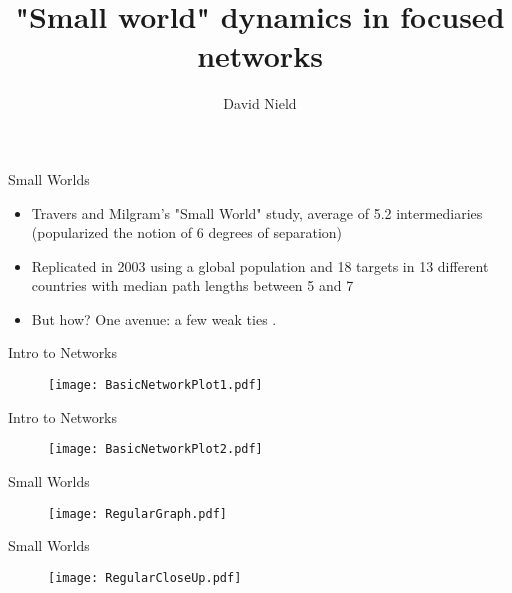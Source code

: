 \documentclass[10pt]{beamer}
\title{"Small world" dynamics in focused networks}
\date{}
\author{David Nield}
\institute{University of California, Berkeley}
\newcommand{\halfblankline}{\quad\vspace{-0.5\baselineskip}\pagebreak[3]}
\begin{document}
\maketitle

\begin{frame}[fragile]{Small Worlds}

\begin{itemize}
\item Travers and Milgram's "Small World" study, average of 5.2 intermediaries (popularized the notion of 6 degrees of separation) \cite{milgram1977}

\halfblankline

\item Replicated in 2003 using a global population and 18 targets in 13 different countries with median path lengths between 5 and 7 \cite{dodds2003}

\halfblankline

\item But how? One avenue: a few weak ties \cite{watts}.

\end{itemize}
\end{frame}

\begin{frame}[fragile]{Intro to Networks}

	\begin{figure}[h]
    \centering
  \texttt{[image: BasicNetworkPlot1.pdf]}
  	\end{figure}

\end{frame}

\begin{frame}[fragile]{Intro to Networks}

	\begin{figure}[h]
    \centering
  \texttt{[image: BasicNetworkPlot2.pdf]}
  	\end{figure}

\end{frame}

\begin{frame}[fragile]{Small Worlds}

	\begin{figure}[h]
    \centering
  \texttt{[image: RegularGraph.pdf]}
  	\end{figure}

\end{frame}

\begin{frame}[fragile]{Small Worlds}

	\begin{figure}[h]
    \centering
  \texttt{[image: RegularCloseUp.pdf]}
  	\end{figure}

\end{frame}
\end{document}
